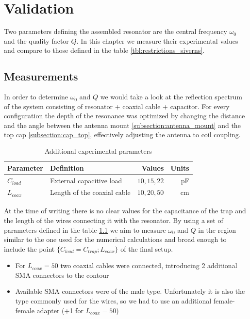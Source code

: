 \chapter{Validation}

Two parameters defining the assembled resonator are the central frequency $\omega_0$ and the quality factor $Q$. In this chapter we measure their experimental values and compare to those defined in the table \ref{tbl:restrictions_siverns}.

\section{Measurements}
\label{sec:measurements}
In order to determine $\omega_0$ and $Q$ we would take a look at the reflection spectrum of the system consisting of resonator + coaxial cable + capacitor. For every configuration the depth of the resonance was optimized by changing the distance and the angle between the antenna mount \ref{subsection:antenna_mount} and the top cap \ref{subsection:cap_top}, effectively adjusting the antenna to coil coupling. 

\begin{table}[h]
\centering
\begin{tabular}{| l | l | r | r |}
	\hline
	Parameter & Definition & Values & Units\\
	\hline \hline
	$C_{load}$ & External capacitive load & $10,15,22$ & pF\\
	\hline
	$L_{coax}$ & Length of the coaxial cable & $10, 20, 50$ & cm\\
	\hline
\end{tabular}
\label{tbl:experimental_parameters}
\caption{Additional experimental parameters}
\end{table}

At the time of writing there is no clear values for the capacitance of the trap and the length of the wires connecting it with the resonator. By using a set of parameters defined in the table \ref{tbl:experimental_parameters} we aim to measure $\omega_0$ and $Q$ in the region similar to the one used for the numerical calculations and broad enough to include the point $\{C_{load} = C_{trap}; L_{coax}\}$ of the final setup.

\begin{itemize}
	\item For $L_{coax}=50$ two coaxial cables were connected, introducing 2 additional SMA connectors to the contour
	\item Available SMA connectors were of the male type. Unfortunately it is also the type commonly used for the wires, so we had to use an additional female-female adapter (+1 for $L_{coax} = 50$)
\end{itemize}

